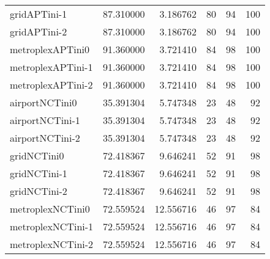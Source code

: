 \begin{longtable}{lrrrrr}
gridAPTini-1 & 87.310000 & 3.186762 & 80 & 94 & 100 \\
gridAPTini-2 & 87.310000 & 3.186762 & 80 & 94 & 100 \\
metroplexAPTini0 & 91.360000 & 3.721410 & 84 & 98 & 100 \\
metroplexAPTini-1 & 91.360000 & 3.721410 & 84 & 98 & 100 \\
metroplexAPTini-2 & 91.360000 & 3.721410 & 84 & 98 & 100 \\
airportNCTini0 & 35.391304 & 5.747348 & 23 & 48 & 92 \\
airportNCTini-1 & 35.391304 & 5.747348 & 23 & 48 & 92 \\
airportNCTini-2 & 35.391304 & 5.747348 & 23 & 48 & 92 \\
gridNCTini0 & 72.418367 & 9.646241 & 52 & 91 & 98 \\
gridNCTini-1 & 72.418367 & 9.646241 & 52 & 91 & 98 \\
gridNCTini-2 & 72.418367 & 9.646241 & 52 & 91 & 98 \\
metroplexNCTini0 & 72.559524 & 12.556716 & 46 & 97 & 84 \\
metroplexNCTini-1 & 72.559524 & 12.556716 & 46 & 97 & 84 \\
metroplexNCTini-2 & 72.559524 & 12.556716 & 46 & 97 & 84 \\
\end{longtable}
